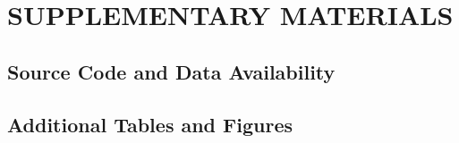 \chapter{SUPPLEMENTARY MATERIALS}\label{app:supplementary}

\section{Source Code and Data Availability}

\section{Additional Tables and Figures}
